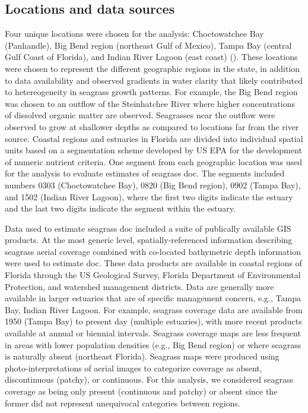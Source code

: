 \documentclass[letterpaper,12pt,oneside]{article}\usepackage[]{graphicx}\usepackage[]{color}
\begin{document}
\subsection{Locations and data sources}

Four unique locations were chosen for the analysis: Choctowatchee Bay (Panhandle), Big Bend region (northeast Gulf of Mexico), Tampa Bay (central Gulf Coast of Florida), and Indian River Lagoon (east coast) ().  These locations were chosen to represent the different geographic regions in the state, in addition to data availability and observed gradients in water clarity that likely contributed to hetereogeneity in seagrass growth patterns.  For example, the Big Bend region was chosen to an outflow of the Steinhatchee River where higher concentrations of dissolved organic matter are observed.  Seagrasses near the outflow were observed to grow at shallower depths as compared to locations far from the river source.  Coastal regions and estuaries in Florida are divided into individual spatial units based on a segmentation scheme developed by US \ac{EPA} for the development of numeric nutrient criteria.  One segment from each geographic location was used for the analysis to evaluate estimates of seagrass \ac{doc}.  The segments included numbers 0303 (Choctowatchee Bay), 0820 (Big Bend region), 0902 (Tampa Bay), and 1502 (Indian River Lagoon), where the first two digits indicate the estuary and the last two digits indicate the segment within the estuary. 

Data used to estimate seagrass \ac{doc} included a suite of publically available \ac{GIS} products.  At the most generic level, spatially-referenced information describing seagrass aerial coverage combined with co-located bathymetric depth information were used to estimate \ac{doc}.  These data products are available in coastal regions of Florida through the US Geological Survey, Florida Department of Environmental Protection, and watershed management districts.  Data are generally more available in larger estuaries that are of specific management concern, e.g., Tampa Bay, Indian River Lagoon.  For example, seagrass coverage data are available from 1950 (Tampa Bay) to present day (multiple estuaries), with more recent products available at annual or  biennial intervals.  Seagrass coverage maps are less frequent in areas with lower population densities (e.g., Big Bend region) or where seagrass is naturally absent (northeast Florida).  Seagrass maps were produced using photo-interpretations of aerial images to categorize coverage as absent, discontinuous (patchy), or continuous.  For this analysis, we considered seagrass coverage as being only present (continuous and patchy) or absent since the former did not represent unequivocal categories between regions. 
\end{document}
